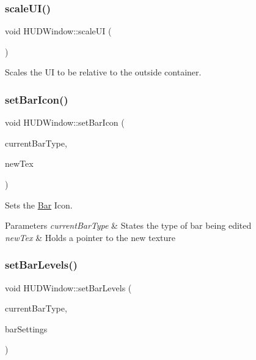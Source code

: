 \subsubsection{\texorpdfstring{scale\+U\+I()}{scaleUI()}}
{\footnotesize\ttfamily void H\+U\+D\+Window\+::scale\+UI (\begin{DoxyParamCaption}{ }\end{DoxyParamCaption})}



Scales the UI to be relative to the outside container. 

\mbox{\label{class_h_u_d_window_a2d6d9c28be865a87ec9ffbba9ea45977}} 
\subsubsection{\texorpdfstring{set\+Bar\+Icon()}{setBarIcon()}}
{\footnotesize\ttfamily void H\+U\+D\+Window\+::set\+Bar\+Icon (\begin{DoxyParamCaption}\item[{\hyperlink{_h_u_d_window_8h_a3bf4c8f0af36af02aca4222b3672bc1d}{Bar\+Type}}]{current\+Bar\+Type,  }\item[{sf\+::\+Texture $\ast$}]{new\+Tex }\end{DoxyParamCaption})}



Sets the \hyperlink{class_bar}{Bar} Icon. 


\begin{DoxyParams}{Parameters}
{\em current\+Bar\+Type} & States the type of bar being edited \\
\hline
{\em new\+Tex} & Holds a pointer to the new texture \\
\hline
\end{DoxyParams}
\mbox{\label{class_h_u_d_window_a579e607782772cb41a7baf6160c14f40}} 
\subsubsection{\texorpdfstring{set\+Bar\+Levels()}{setBarLevels()}}
{\footnotesize\ttfamily void H\+U\+D\+Window\+::set\+Bar\+Levels (\begin{DoxyParamCaption}\item[{\hyperlink{_h_u_d_window_8h_a3bf4c8f0af36af02aca4222b3672bc1d}{Bar\+Type}}]{current\+Bar\+Type,  }\item[{\hyperlink{struct_util_1_1_limits}{Util\+::\+Limits}}]{bar\+Settings }\end{DoxyParamCaption})}



